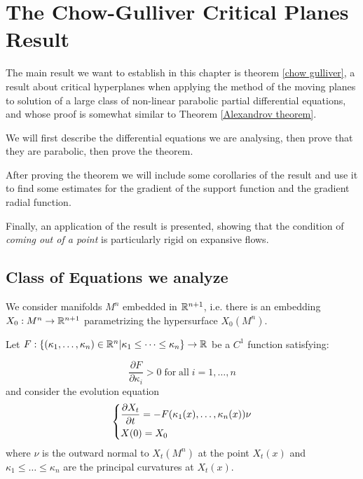 \chapter{The Chow-Gulliver Critical Planes Result}

The main result we want to establish in this chapter is theorem \ref{chow gulliver}, a result about critical hyperplanes when applying the method of the moving planes to solution of a large class of non-linear parabolic partial differential equations, and whose proof is somewhat similar to Theorem \ref{Alexandrov theorem}. 

We will first describe the differential equations we are analysing, then prove that they are parabolic, then prove the theorem. 

After proving the theorem we will include some corollaries of the result and use it to find some estimates for the gradient of the support function and the gradient radial function. 

Finally, an application of the result is presented, showing that the condition of \textit{coming out of a point} is particularly rigid on expansive flows. 

\section{Class of Equations we analyze}

We consider manifolds $M^n$ embedded in $\mathbb{R}^{n+1}$, i.e. there is an embedding $X_0 : M^n \rightarrow \mathbb{R}^{n+1}$ parametrizing the hypersurface $X_0(M^n)$. 

Let $F:\{(\kappa_1, \dots , \kappa_n)\in \mathbb{R}^n\vert \kappa_1\leq \dots \leq \kappa_n\}\rightarrow \mathbb{R}$ be a $C^1$ function satisfying:

\begin{equation}
	\frac{\partial F}{\partial \kappa_i} > 0 \mathrm{\; for \; all } \; i=1,\dots, n \label{parabolicità}
\end{equation}
and consider the evolution equation 
\begin{align}
	\begin{dcases}
		\frac{\partial X_t}{\partial t} = - F(\kappa_1(x), \dots , \kappa_n(x)) \nu\\
		X(0)= X_0
	\end{dcases} \label{evolutioneq}
\end{align}
where $\nu$ is the outward normal to $X_t(M^n)$ at the point $X_t(x)$ and $\kappa_1\leq \dots \leq \kappa_n$ are the principal curvatures at $X_t(x)$. 



